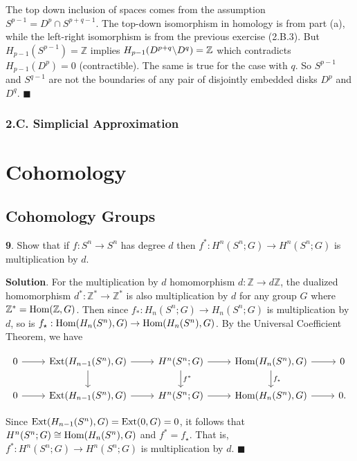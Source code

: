 \documentclass{article}
\newcommand{\Z}{\mathbb{Z}}
\newcommand{\Hom}{\textnormal{Hom}}
\newcommand{\Ext}{\textnormal{Ext}}
\begin{document}
The top down inclusion of spaces comes from the assumption $S^{p-1} = D^{p}\cap S^{p+q-1}$. The top-down isomorphism in homology is from part (a), while the left-right isomorphism is from the previous exercise (2.B.3). But $H_{p-1}(S^{p-1}) = \Z$ implies $H_{p-1}(D^{p+q}\textnormal{\textbackslash} D^{q}) = \Z$ which contradicts $H_{p-1}(D^{p}) = 0$ (contractible). The same is true for the case with $q$. So $S^{p-1}$ and $S^{q-1}$ are not the boundaries of any pair of disjointly embedded disks $D^{p}$ and $D^{q}$. $\blacksquare$
\bigskip
\bigskip

\subsubsection*{2.C. Simplicial Approximation}

\newpage

\section{Cohomology}

\subsection{Cohomology Groups}

\tab \textbf{9}. Show that if $f:S^{n}\to S^{n}$ has degree $d$ then $f^{\ast}: H^{n}(S^{n};G)\to H^{n}(S^{n};G)$ is multiplication by $d$.
\medskip

\textbf{Solution}. For the multiplication by $d$ homomorphism $d: \Z\to d\Z$, the dualized homomorphism $d^{\ast}:\Z^{\ast}\to \Z^{\ast}$ is also multiplication by $d$ for any group $G$ where $\Z^{\ast} = \Hom(\Z, G)$. Then since $f_{\ast}:H_{n}(S^{n};G)\to H_{n}(S^{n};G)$ is multiplication by $d$, so is $f_{\star}:\Hom(H_{n}(S^{n}), G)\to \Hom(H_{n}(S^{n}), G)$. By the Universal Coefficient Theorem, we have

\[\begin{tikzcd}
0 \arrow{r} & \Ext(H_{n-1}(S^{n}), G) \arrow{r} \arrow{d} & H^{n}(S^{n};G) \arrow{r} \arrow{d}{f^{\ast}} & \Hom(H_{n}(S^{n}), G) \arrow{r} \arrow{d}{f_{\star}} & 0\\
0 \arrow{r} & \Ext(H_{n-1}(S^{n}), G) \arrow{r} & H^{n}(S^{n};G) \arrow{r} & \Hom(H_{n}(S^{n}), G) \arrow{r} & 0.
\end{tikzcd}\]
\medskip

Since $\Ext(H_{n-1}(S^{n}), G) = \Ext(0, G) = 0$, it follows that $H^{n}(S^{n};G)\cong \Hom(H_{n}(S^{n}), G)$ and $f^{\ast} = f_{\star}$. That is, $f^{\ast}:H^{n}(S^{n};G)\to H^{n}(S^{n};G)$ is multiplication by $d$. $\blacksquare$
\bigskip
\bigskip
\end{document}
